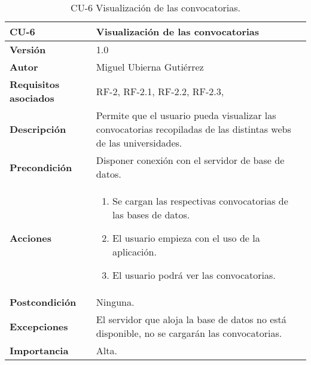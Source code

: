 \begin{table}[p]
	\centering
	\begin{tabularx}{\linewidth}{ p{} p{} }
		\toprule
		\textbf{CU-6}    & \textbf{Visualización de las convocatorias}\\
		\toprule
		\textbf{Versión}              & 1.0    \\
		\textbf{Autor}                & Miguel Ubierna Gutiérrez \\
		\textbf{Requisitos asociados} & RF-2, RF-2.1, RF-2.2, RF-2.3, \\
		\textbf{Descripción}          & Permite que el usuario pueda visualizar las convocatorias recopiladas de las distintas webs de las universidades.  \\
		\textbf{Precondición}         & Disponer conexión con el servidor de base de datos.\\
		\textbf{Acciones}             &
		\begin{enumerate}
			\def\labelenumi{\arabic{enumi}.}
			\tightlist
   			\item Se cargan las respectivas convocatorias de las bases de datos.
			\item El usuario empieza con el uso de la aplicación.
			\item El usuario podrá ver las convocatorias.
		\end{enumerate}\\
		\textbf{Postcondición}        & Ninguna. \\
		\textbf{Excepciones}          & El servidor que aloja la base de datos no está disponible, no se cargarán las convocatorias.  \\
		\textbf{Importancia}          & Alta.  \\
		\bottomrule
	\end{tabularx}
	\caption{CU-6 Visualización de las convocatorias.}
\end{table}


